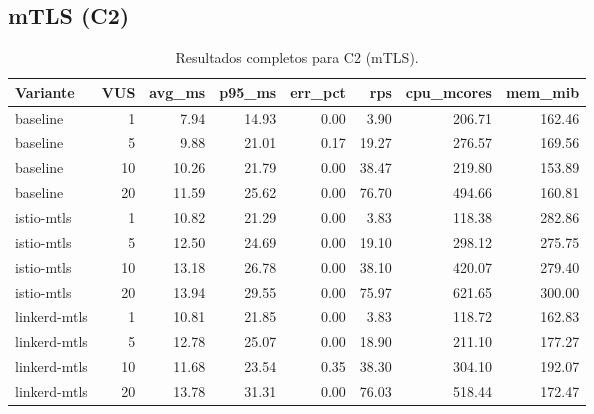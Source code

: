 \subsection{mTLS (C2)}
\begin{table}[htbp]
\centering
\small
\caption{Resultados completos para C2 (mTLS).}
\label{tab:s2-c2}
\begin{tabular}{lrrrrrrr}
\toprule
Variante & VUS & avg\_ms & p95\_ms & err\_pct & rps & cpu\_mcores & mem\_mib \\
\midrule
baseline     & 1  & 7.94  & 14.93 & 0.00 & 3.90  & 206.71 & 162.46 \\
baseline     & 5  & 9.88  & 21.01 & 0.17 & 19.27 & 276.57 & 169.56 \\
baseline     & 10 & 10.26 & 21.79 & 0.00 & 38.47 & 219.80 & 153.89 \\
baseline     & 20 & 11.59 & 25.62 & 0.00 & 76.70 & 494.66 & 160.81 \\
istio-mtls   & 1  & 10.82 & 21.29 & 0.00 & 3.83  & 118.38 & 282.86 \\
istio-mtls   & 5  & 12.50 & 24.69 & 0.00 & 19.10 & 298.12 & 275.75 \\
istio-mtls   & 10 & 13.18 & 26.78 & 0.00 & 38.10 & 420.07 & 279.40 \\
istio-mtls   & 20 & 13.94 & 29.55 & 0.00 & 75.97 & 621.65 & 300.00 \\
linkerd-mtls & 1  & 10.81 & 21.85 & 0.00 & 3.83  & 118.72 & 162.83 \\
linkerd-mtls & 5  & 12.78 & 25.07 & 0.00 & 18.90 & 211.10 & 177.27 \\
linkerd-mtls & 10 & 11.68 & 23.54 & 0.35 & 38.30 & 304.10 & 192.07 \\
linkerd-mtls & 20 & 13.78 & 31.31 & 0.00 & 76.03 & 518.44 & 172.47 \\
\bottomrule
\end{tabular}
\end{table}

